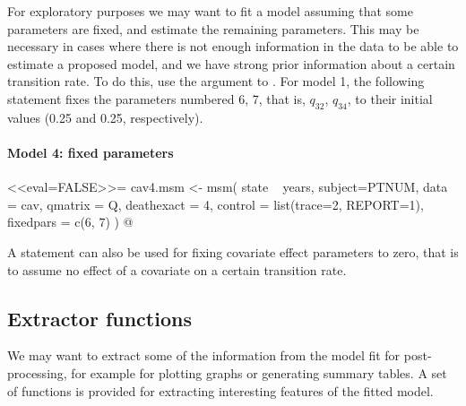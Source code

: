 For exploratory purposes we may want to fit a model assuming that some
parameters are fixed, and estimate the remaining parameters.  This may
be necessary in cases where there is not enough information in the
data to be able to estimate a proposed model, and we have strong prior
information about a certain transition rate. To do this, use the
 argument to .  For model 1, the
following statement fixes the parameters numbered 6, 7, that is,
$q_{32}$, $q_{34}$, to their initial values (0.25 and 0.25,
respectively).

\paragraph{Model 4: fixed parameters}
<<eval=FALSE>>=
cav4.msm <- msm( state ~ years, subject=PTNUM, data = cav,
                qmatrix = Q, deathexact = 4,
                control = list(trace=2, REPORT=1),
                fixedpars = c(6, 7) )
@

A  statement can also be used for fixing covariate
effect parameters to zero, that is to assume no effect of a covariate
on a certain transition rate.

\subsection{Extractor functions}
\label{sec:extractor}

We may want to extract some of the information from the 
model fit for post-processing, for example for plotting graphs or
generating summary tables.  A set of functions is provided for
extracting interesting features of the fitted model.


